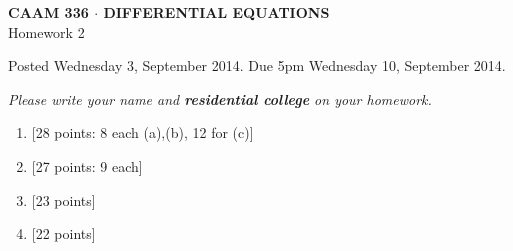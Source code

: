 \documentclass[10pt]{article}
\begin{document}
\newcommand{\pd}[3]{\frac{\partial^{#3} #1}{\partial #2^{#3}}}

\vspace*{-5em}
\begin{center}
\large \textsf{\textbf{CAAM 336 $\cdot$ DIFFERENTIAL EQUATIONS}\\[0.5em]
Homework 2 }
\end{center}

Posted Wednesday 3, September 2014.  Due 5pm Wednesday 10, September 2014.

\begin{center}
\emph{Please write your name and \textbf{residential college} on your homework.}
\end{center}

\begin{enumerate}
\item {[28 points: 8 each (a),(b), 12 for (c)]}  
\newpage
\item {[27 points: 9 each]}  
\newpage
\item {[23 points]}  


%
\newpage
\item {[22 points]}  





\end{enumerate}
\end{document}
